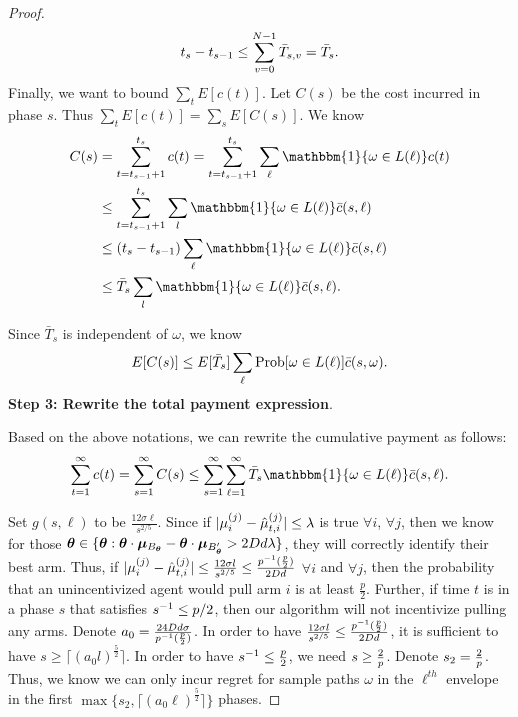 \begin{proof}
\begin{align}
t_{s}-t_{s-1}\leq \sum_{v=0}^{N-1}\bar{T}_{s,v}=\bar{T}_{s}.
\end{align}
Finally, we want to bound $\sum_{t}E[c(t)]$. Let $C(s)$ be the cost incurred in phase $s$. Thus $\sum_{t}E[c(t)]=\sum_{s}E[C(s)]$. We know
\begin{align}
C(s)&=\sum_{t=t_{s-1}+1}^{t_{s}}c(t)=\sum_{t=t_{s-1}+1}^{t_{s}}\sum_{\ell}\mathbbm{1}\{\omega\in L(\ell)\}c(t) \nonumber \\
&\leq \sum_{t=t_{s-1}+1}^{t_{s}}\sum_{l}\mathbbm{1}\{\omega\in L(\ell)\}\bar{c}(s,\ell) \nonumber \\
&\leq (t_{s}-t_{s-1})\sum_{\ell} \mathbbm{1}\{\omega\in L(\ell)\}\bar{c}(s,\ell) \nonumber \\
&\leq \bar{T}_{s}\sum_{l}\mathbbm{1}\{\omega\in L(\ell)\}\bar{c}(s,\ell). \nonumber
\end{align}

Since $\bar{T}_{s}$ is independent of $\omega$, we know
\begin{align}
E[C(s)]\leq E[\bar{T}_{s}]\sum_{\ell}\Prob{\omega\in L(\ell)}\bar{c}(s,\omega). \nonumber
\end{align}
\noindent\textbf{Step 3: Rewrite the total payment expression}.

Based on the above notations, we can rewrite the cumulative payment as follows:
\begin{align}
\sum_{t=1}^{\infty}c(t) =\sum_{s=1}^{\infty}C(s)
\leq  \sum_{s=1}^{\infty}\sum_{\ell=1}^{\infty}\bar{T}_{s}\mathbbm{1}\{\omega\in L(\ell)\}\bar{c}(s,\ell). \nonumber
\end{align}

Set $g(s,\ell)$ to be $\frac{12\sigma \ell}{s^{2/5}}$. Since if $|\mu_{i}^{(j)}-\hat{\mu}_{t,i}^{(j)}|\leq \lambda$ is true $\forall i$, $\forall j$, then we know for those $\bm{\theta}\in \{\bm{\theta}:\bm{\theta}\cdot \bm{\mu}_{B_{\bm{\theta}}}-\bm{\theta} \cdot \bm{\mu}_{B'_{\bm{\theta}}}> 2D d\lambda\}$, they will correctly identify their best arm. Thus, if $|\mu_{i}^{(j)}-\hat{\mu}_{t,i}^{(j)}|\leq \frac{12\sigma l}{s^{2/5}} \leq \frac{p^{-1}(\frac{p}{2})}{2D d}$ $\forall i$ and $\forall j$, then the probability that an unincentivized agent would pull arm $i$ is at least $\frac{p}{2}$. Further, if time $t$ is in a phase $s$ that satisfies $s^{-1}\leq p/2$, then our algorithm will not incentivize pulling any arms. Denote $a_0=\frac{24D d\sigma}{p^{-1}(\frac{p}{2})}$. In order to have $\frac{12\sigma l}{s^{2/5}}\leq \frac{p^{-1}(\frac{p}{2})}{2D d}$, it is sufficient to have $s\geq \lceil (a_{0} l)^\frac{5}{2} \rceil$. In order to have $s^{-1}\leq \frac{p}{2}$, we need $s\geq \frac{2}{p}$. Denote $s_2=\frac{2}{p}$. Thus, we know we can only incur regret for sample paths $\omega$ in the $\ell^{th}$ envelope in the first $\max\{s_2,\lceil (a_0 \ell)^\frac{5}{2} \rceil\}$ phases.


\end{proof}
